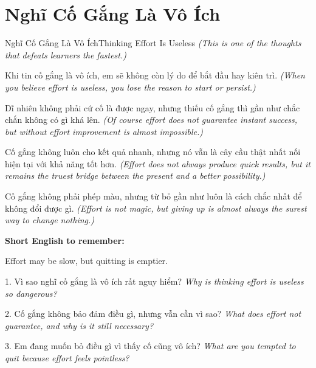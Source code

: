 \section{Nghĩ Cố Gắng Là Vô Ích}
\begin{truyen}{Nghĩ Cố Gắng Là Vô Ích}{Thinking Effort Is Useless}
\textit{(This is one of the thoughts that defeats learners the fastest.)}

Khi tin cố gắng là vô ích, em sẽ không còn lý do để bắt đầu hay kiên trì.
\textit{(When you believe effort is useless, you lose the reason to start or persist.)}

Dĩ nhiên không phải cứ cố là được ngay, nhưng thiếu cố gắng thì gần như chắc chắn không có gì khá lên.
\textit{(Of course effort does not guarantee instant success, but without effort improvement is almost impossible.)}

Cố gắng không luôn cho kết quả nhanh, nhưng nó vẫn là cây cầu thật nhất nối hiện tại với khả năng tốt hơn.
\textit{(Effort does not always produce quick results, but it remains the truest bridge between the present and a better possibility.)}
\end{truyen}

\begin{baihoc}
Cố gắng không phải phép màu, nhưng từ bỏ gần như luôn là cách chắc nhất để không đổi được gì.
\textit{(Effort is not magic, but giving up is almost always the surest way to change nothing.)}
\end{baihoc}

\begin{ghinhoanh}
\textbf{Short English to remember:}

Effort may be slow, but quitting is emptier.

\end{ghinhoanh}

\begin{tuhocnhanh}
1. Vì sao nghĩ cố gắng là vô ích rất nguy hiểm? \textit{Why is thinking effort is useless so dangerous?}

2. Cố gắng không bảo đảm điều gì, nhưng vẫn cần vì sao? \textit{What does effort not guarantee, and why is it still necessary?}

3. Em đang muốn bỏ điều gì vì thấy cố cũng vô ích? \textit{What are you tempted to quit because effort feels pointless?}
\end{tuhocnhanh}
\ngancach